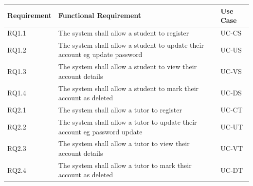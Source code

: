 \documentclass[12pt]{article}
\begin{document}
{
\centering
\begin{longtable}{| l | p{10cm}| l |}
			\hline
			\textbf{Requirement} & \textbf{Functional Requirement} & \textbf{Use Case}

			\\ \hline RQ1.1 & The system shall allow a student to register  & UC-CS \\ \hline
			RQ1.2 & The system shall allow a student to update their account eg update password& UC-US \\ \hline
			RQ1.3 & The system shall allow a student to view their account details  & UC-VS \\ \hline
			RQ1.4 & The system shall allow a student to mark their account as deleted & UC-DS  \\ \hline

			RQ2.1 & The system shall allow a tutor to register & UC-CT \\ \hline
			RQ2.2 & The system shall allow a tutor to update their account eg password update & UC-UT \\ \hline
			RQ2.3 & The system shall allow a tutor to view their account details & UC-VT \\ \hline
			RQ2.4 & The system shall allow a tutor to mark their account as deleted & UC-DT \\ \hline





\end{longtable}}
\end{document}
